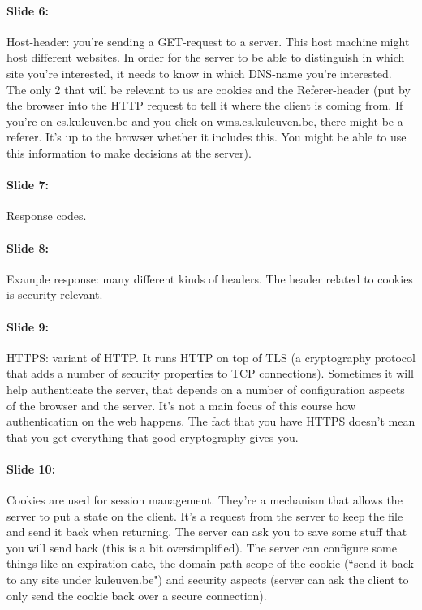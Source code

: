 \documentclass[10pt,a4paper]{report}
\begin{document}
\paragraph{Slide 6:} Host-header: you're sending a GET-request to a server. This host machine might host different websites. In order for the server to be able to distinguish in which site you're interested, it needs to know in which DNS-name you're interested. \\
The only 2 that will be relevant to us are cookies and the Referer-header (put by the browser into the HTTP request to tell it where the client is coming from. If you're on cs.kuleuven.be and you click on wms.cs.kuleuven.be, there might be a referer. It's up to the browser whether it includes this. You might be able to use this information to make decisions at the server).

\paragraph{Slide 7:} Response codes. 

\paragraph{Slide 8:} Example response: many different kinds of headers. The header related to cookies is security-relevant. 

\paragraph{Slide 9:} HTTPS: variant of HTTP. It runs HTTP on top of TLS (a cryptography protocol that adds a number of security properties to TCP connections). Sometimes it will help authenticate the server, that depends on a number of configuration aspects of the browser and the server. It's not a main focus of this course how authentication on the web happens. The fact that you have HTTPS doesn't mean that you get everything that good cryptography gives you. 

\paragraph{Slide 10:} Cookies are used for session management. They're a mechanism that allows the server to put a state on the client. It's a request from the server to keep the file and send it back when returning. The server can ask you to save some stuff that you will send back (this is a bit oversimplified). The server can configure some things like an expiration date, the domain path scope of the cookie (``send it back to any site under kuleuven.be") and security aspects (server can ask the client to only send the cookie back over a secure connection).
\end{document}
